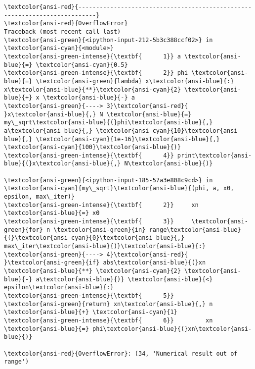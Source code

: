 \documentclass[11pt]{article}
\begin{document}
    \begin{Verbatim}[commandchars=\\\{\}, frame=single, framerule=2mm, rulecolor=\color{outerrorbackground}]
\textcolor{ansi-red}{---------------------------------------------------------------------------}
\textcolor{ansi-red}{OverflowError}                             Traceback (most recent call last)
\textcolor{ansi-green}{<ipython-input-212-5b3c388ccf02>} in \textcolor{ansi-cyan}{<module>}
\textcolor{ansi-green-intense}{\textbf{      1}} a \textcolor{ansi-blue}{=} \textcolor{ansi-cyan}{0.5}
\textcolor{ansi-green-intense}{\textbf{      2}} phi \textcolor{ansi-blue}{=} \textcolor{ansi-green}{lambda} x\textcolor{ansi-blue}{:} x\textcolor{ansi-blue}{**}\textcolor{ansi-cyan}{2} \textcolor{ansi-blue}{+} x \textcolor{ansi-blue}{-} a
\textcolor{ansi-green}{----> 3}\textcolor{ansi-red}{ }x\textcolor{ansi-blue}{,} N \textcolor{ansi-blue}{=} my\_sqrt\textcolor{ansi-blue}{(}phi\textcolor{ansi-blue}{,} a\textcolor{ansi-blue}{,} \textcolor{ansi-cyan}{10}\textcolor{ansi-blue}{,} \textcolor{ansi-cyan}{1e-16}\textcolor{ansi-blue}{,} \textcolor{ansi-cyan}{100}\textcolor{ansi-blue}{)}
\textcolor{ansi-green-intense}{\textbf{      4}} print\textcolor{ansi-blue}{(}x\textcolor{ansi-blue}{,} N\textcolor{ansi-blue}{)}

\textcolor{ansi-green}{<ipython-input-185-57a3e808c9cd>} in \textcolor{ansi-cyan}{my\_sqrt}\textcolor{ansi-blue}{(phi, a, x0, epsilon, max\_iter)}
\textcolor{ansi-green-intense}{\textbf{      2}}     xn \textcolor{ansi-blue}{=} x0
\textcolor{ansi-green-intense}{\textbf{      3}}     \textcolor{ansi-green}{for} n \textcolor{ansi-green}{in} range\textcolor{ansi-blue}{(}\textcolor{ansi-cyan}{0}\textcolor{ansi-blue}{,} max\_iter\textcolor{ansi-blue}{)}\textcolor{ansi-blue}{:}
\textcolor{ansi-green}{----> 4}\textcolor{ansi-red}{         }\textcolor{ansi-green}{if} abs\textcolor{ansi-blue}{(}xn \textcolor{ansi-blue}{**} \textcolor{ansi-cyan}{2} \textcolor{ansi-blue}{-} a\textcolor{ansi-blue}{)} \textcolor{ansi-blue}{<} epsilon\textcolor{ansi-blue}{:}
\textcolor{ansi-green-intense}{\textbf{      5}}             \textcolor{ansi-green}{return} xn\textcolor{ansi-blue}{,} n \textcolor{ansi-blue}{+} \textcolor{ansi-cyan}{1}
\textcolor{ansi-green-intense}{\textbf{      6}}         xn \textcolor{ansi-blue}{=} phi\textcolor{ansi-blue}{(}xn\textcolor{ansi-blue}{)}

\textcolor{ansi-red}{OverflowError}: (34, 'Numerical result out of range')
    \end{Verbatim}
\end{document}
